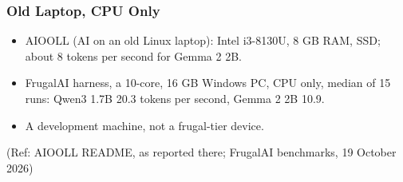 \begin{frame}[fragile]\frametitle{Old Laptop, CPU Only}
\begin{itemize}
\item AIOOLL (AI on an old Linux laptop): Intel i3-8130U, 8 GB RAM, SSD; about 8 tokens per second for Gemma 2 2B.
\item FrugalAI harness, a 10-core, 16 GB Windows PC, CPU only, median of 15 runs: Qwen3 1.7B 20.3 tokens per second, Gemma 2 2B 10.9.
\item A development machine, not a frugal-tier device.
\end{itemize}
{\tiny (Ref: AIOOLL README, as reported there; FrugalAI benchmarks, 19 October 2026)}
\end{frame}

